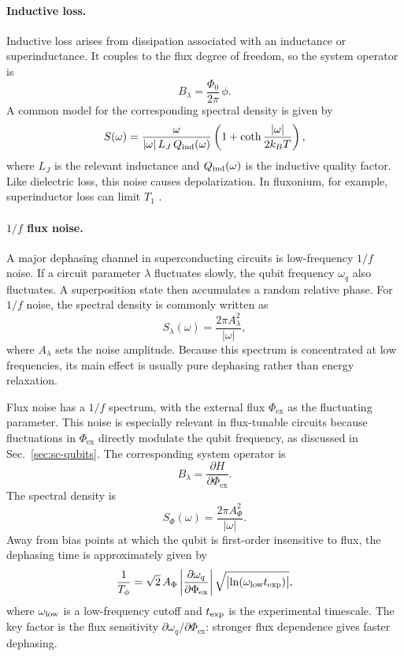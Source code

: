 \paragraph{Inductive loss.}
Inductive loss arises from dissipation associated with an inductance or superinductance. It couples to the flux degree of freedom, so the system operator is
\[
B_\lambda=\frac{\Phi_0}{2\pi}\,\phi.
\]
A common model for the corresponding spectral density is given by \cite{Smith2020,Nguyen2019}
\[
S(\omega)=\frac{\omega}{|\omega|\,L_J\,Q_{\rm ind}(\omega)}
\left(1+\coth\frac{|\omega|}{2k_B T}\right),
\]
where \(L_J\) is the relevant inductance and \(Q_{\rm ind}(\omega)\) is the inductive quality factor. Like dielectric loss, this noise causes depolarization. In fluxonium, for example, superinductor loss can limit \(T_1\) \cite{Hazard2019inductor}.

\paragraph{\texorpdfstring{$1/f$}{1/f} flux noise.}
A major dephasing channel in superconducting circuits is low-frequency \(1/f\) noise. If a circuit parameter \(\lambda\) fluctuates slowly, the qubit frequency \(\omega_q\) also fluctuates. A superposition state then accumulates a random relative phase. For \(1/f\) noise, the spectral density is commonly written as
\[
S_{\lambda}(\omega)=\frac{2\pi A_{\lambda}^2}{|\omega|},
\]
where \(A_{\lambda}\) sets the noise amplitude. Because this spectrum is concentrated at low frequencies, its main effect is usually pure dephasing rather than energy relaxation.

Flux noise has a \(1/f\) spectrum, with the external flux \(\Phi_{\mathrm{ex}}\) as the fluctuating parameter. This noise is especially relevant in flux-tunable circuits because fluctuations in \(\Phi_{\mathrm{ex}}\) directly modulate the qubit frequency, as discussed in Sec.~\ref{sec:sc-qubits}. The corresponding system operator is
\[
B_\lambda=\frac{\partial H}{\partial \Phi_{\mathrm{ex}}}.
\]
The spectral density is
\[
S_{\Phi}(\omega)=\frac{2\pi A_{\Phi}^2}{|\omega|}.
\]
Away from bias points at which the qubit is first-order insensitive to flux, the dephasing time is approximately given by \cite{groszkowski2018coherence}
\[
\frac{1}{T_{\phi}}
=
\sqrt{2}\,A_{\Phi}
\left|\frac{\partial \omega_q}{\partial \Phi_{\mathrm{ex}}}\right|
\sqrt{\bigl|\ln(\omega_{\rm low} t_{\rm exp})\bigr|},
\]
where \(\omega_{\rm low}\) is a low-frequency cutoff and \(t_{\rm exp}\) is the experimental timescale. The key factor is the flux sensitivity \(\partial \omega_q/\partial \Phi_{\mathrm{ex}}\): stronger flux dependence gives faster dephasing.
